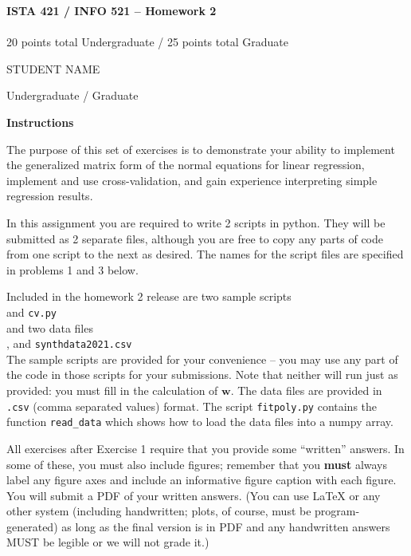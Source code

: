 \documentclass[10pt]{article}
\newcommand{\latex}{\LaTeX\xspace}
\begin{document}
\begin{center}
    {\Large {\bf ISTA 421 / INFO 521 -- Homework 2}} \\
     \\
    20 points total Undergraduate / 25 points total Graduate

\end{center}

\begin{flushright}
STUDENT NAME %

Undergraduate / Graduate %
\end{flushright}


\vspace{1cm}
{\Large {\bf Instructions}}

The purpose of this set of exercises is to demonstrate your ability to implement the generalized matrix form of the normal equations for linear regression, implement and use cross-validation, and gain experience interpreting simple regression results.

In this assignment you are required to write 2 scripts in python.  They will be submitted as 2 separate files, although you are free to copy any parts of code from one script to the next as desired.  The names for the script files are specified in problems 1 and 3 below.

Included in the homework 2 release are two sample scripts \\ 
\-\hspace{2cm}{\tt fitpoly.py} and {\tt cv.py} \\
and two data files\\
\-\hspace{2cm}{\tt womens100.csv}, and {\tt synthdata2021.csv}\\

The sample scripts are provided for your convenience -- you may use any part of the code in those scripts for your submissions.  Note that neither will run just as provided: you must fill in the calculation of $\mathbf{w}$.  The data files are provided in {\tt .csv} (comma separated values) format.  The script {\tt fitpoly.py} contains the function {\tt read\_data} which shows how to load the data files into a numpy array.

All exercises after Exercise 1 require that you provide some ``written'' answers.  In some of these, you must also include figures; remember that you {\bf must} always label any figure axes and include an informative figure caption with each figure.  You will submit a PDF of your written answers.  (You can use \latex or any other system (including handwritten; plots, of course, must be program-generated) as long as the final version is in PDF and any handwritten answers MUST be legible or we will not grade it.)
\end{document}
